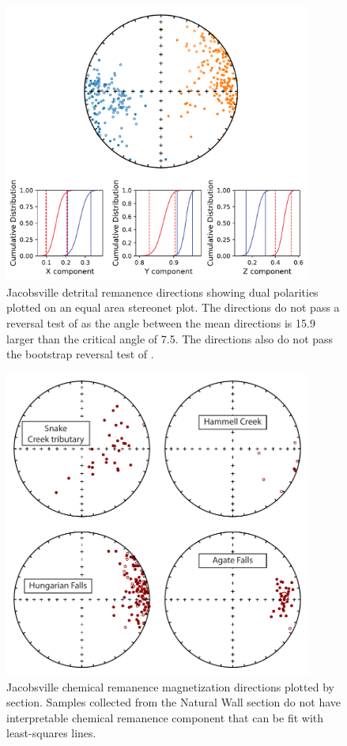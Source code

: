 \documentclass[11pt,letterpaper]{article}
\begin{document}
\begin{figure}[h!]
\centering
\includegraphics[width=0.9\textwidth]{SI_reversal_test.pdf}
\caption{Jacobsville detrital remanence directions showing dual polarities plotted on an equal area stereonet plot. The directions do not pass a reversal test of \cite{McFadden1990a} as the angle between the mean directions is 15.9\textdegree\, larger than the critical angle of 7.5\textdegree. The directions also do not pass the bootstrap reversal test of \cite{Tauxe1991a}. }
\label{fig:Jacobsville_reversal_test}
\end{figure}

\begin{figure}[h!]
\centering
\includegraphics[width=0.9\textwidth]{SI_hct.pdf}
\caption{Jacobsville chemical remanence magnetization directions plotted by section. Samples collected from the Natural Wall section do not have interpretable chemical remanence component that can be fit with least-squares lines. }
\label{fig:Jacobsville_CRM}
\end{figure}
\end{document}
